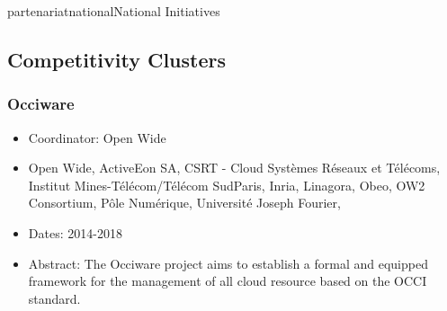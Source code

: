 \documentclass{ra2018}
\begin{document}
\begin{module}{partenariat}{national}{National Initiatives}
\subsection{Competitivity Clusters}

\subsubsection*{\label{project:occiware}Occiware}
\begin{itemize}
	\item Coordinator: Open Wide
	\item Open Wide, ActiveEon SA, CSRT - Cloud  Systèmes Réseaux et Télécoms, Institut Mines-Télécom/Télécom SudParis, Inria, Linagora, Obeo, OW2 Consortium, Pôle Numérique, Université Joseph Fourier, 
	\item Dates: 2014-2018
	\item Abstract: The Occiware project aims to establish a formal and equipped framework for the management of all cloud resource based on the OCCI standard. 
\end{itemize}










\end{module}
\end{document}
